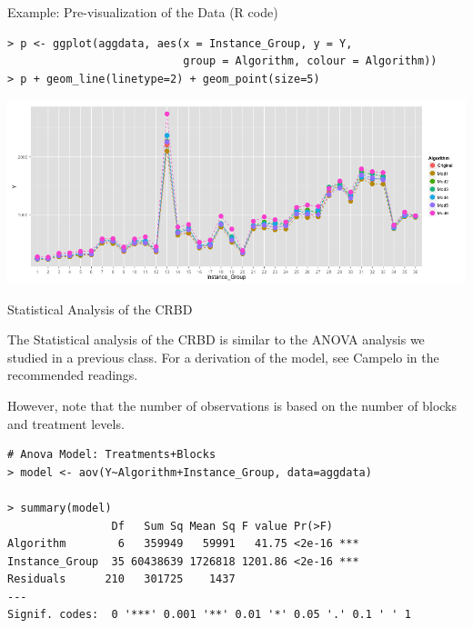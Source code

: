 \begin{frame}[fragile]{Example: Pre-visualization of the Data (R code)}

{\smaller
\begin{verbatim}
> p <- ggplot(aggdata, aes(x = Instance_Group, y = Y,
                           group = Algorithm, colour = Algorithm))
> p + geom_line(linetype=2) + geom_point(size=5)
\end{verbatim}
}

\includegraphics[width=.9\textwidth]{../img/algo_lineplot.png}
\end{frame}

\begin{frame}[fragile]{Statistical Analysis of the CRBD}

The Statistical analysis of the CRBD is similar to the ANOVA analysis we
studied in a previous class. For a derivation of the model, see Campelo in the
recommended readings. \bigskip

However, note that the number of observations is based on the number of blocks
and treatment levels.

{\smaller
\begin{verbatim}
# Anova Model: Treatments+Blocks
> model <- aov(Y~Algorithm+Instance_Group, data=aggdata)

> summary(model)
                Df   Sum Sq Mean Sq F value Pr(>F)
Algorithm        6   359949   59991   41.75 <2e-16 ***
Instance_Group  35 60438639 1726818 1201.86 <2e-16 ***
Residuals      210   301725    1437
---
Signif. codes:  0 '***' 0.001 '**' 0.01 '*' 0.05 '.' 0.1 ' ' 1
\end{verbatim}
}
\end{frame}


